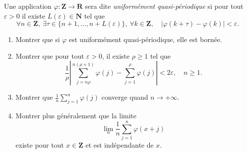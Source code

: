 \documentclass[a4paper,10pt,openany]{article}
\theoremstyle{plain}
\theoremstyle{definition}
\newcommand{\R}{\mathbf{R}}
\newcommand{\Z}{\mathbf{Z}}
\newcommand{\N}{\mathbf{N}}
\begin{document}
\noindent Une application $\varphi : \Z \to \R$ sera dite \textit{uniform\'ement quasi-p\'eriodique} si pour tout $\varepsilon > 0$ il existe $L(\varepsilon) \in \N$ tel que 
$$
\forall n \in \Z,~ \exists \tau \in \{n+1, \dots, n +L(\varepsilon)\},~\forall k \in \Z, \quad |\varphi(k+ \tau) - \varphi(k)| < \varepsilon.
$$
\begin{enumerate}
\item Montrer que si $\varphi$ est uniform\'ement quasi-p\'eriodique, elle est born\'ee.
\item Montrer que pour tout $\varepsilon > 0$, il existe $\rho \geq 1$ tel que
$$
\frac{1}{\rho} \left|\sum_{j=n\rho}^{n(\rho+1)} \varphi(j) - \sum_{j=1}^\rho \varphi(j) \right| < 2\varepsilon, \quad n \geq 1.
$$
\item Montrer que $\displaystyle{\frac{1}{n} \sum_{j=1}^n} \varphi(j)$ converge quand $n \to +\infty$.
\item Montrer plus g\'en\'eralement que la limite 
$$\lim_n \frac{1}{n}\sum_{j=1}^n \varphi(x+j)$$
existe pour tout $x \in \Z$ et est ind\'ependante de $x$.
\end{enumerate}
\end{document}

